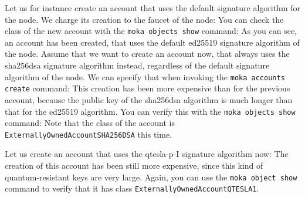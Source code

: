 Let us for instance create an account that uses the default signature algorithm for the node.
We charge its creation to the faucet of the node:
%
%
%
You can check the class of the new account with the \texttt{moka objects show} command:
%
%
As you can see, an account has been created, that uses the default ed25519
signature algorithm of the node.
Assume that we want to create an account now, that always uses the sha256dsa signature algorithm instead,
regardless of the default signature algorithm of the node. We can specify that when invoking the
\texttt{moka accounts create} command:
%
%
%
This creation has been more expensive than for the previous account, because the public key of the
sha256dsa algorithm is much longer than that for the ed25519 algorithm.
You can verify this with the \texttt{moka objects show} command:
%
%
Note that the class of the account is \texttt{ExternallyOwnedAccountSHA256DSA} this time.

Let us create an account that uses the qtesla-p-I signature algorithm now:
%
%
%
The creation of this account has been still more expensive, since this kind of quantum-resistant
keys are very large. Again, you can use the \texttt{moka object show}
command to verify that it has class \texttt{ExternallyOwnedAccountQTESLA1}.

